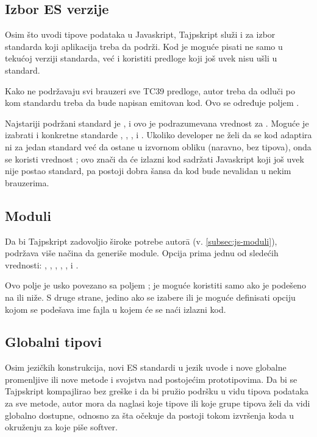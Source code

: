 \subsection{Izbor ES verzije}

Osim što uvodi tipove podataka u Javaskript, Tajpskript služi i za izbor standarda koji aplikacija treba da podrži.
Kod je moguće pisati ne samo u tekućoj verziji standarda, već i koristiti predloge koji još uvek nisu ušli u standard.

Kako ne podržavaju svi brauzeri sve TC39 predloge, autor treba da odluči po kom standardu treba da bude napisan emitovan kod.
Ovo se određuje poljem .

Najstariji podržani standard je , i ovo je podrazumevana vrednost za .
Moguće je izabrati i konkretne standarde , , ,  i .
Ukoliko developer ne želi da se kod adaptira ni za jedan standard već da ostane u izvornom obliku (naravno, bez tipova), onda se koristi vrednost ; ovo znači da će izlazni kod sadržati Javaskript koji još uvek nije postao standard, pa postoji dobra šansa da kod bude nevalidan u nekim brauzerima.

\subsection{Moduli}

Da bi Tajpskript zadovoljio široke potrebe autor\=a (v. \cref{subsec:js-moduli}), podržava više načina da generiše module.
Opcija  prima jednu od sledećih vrednosti: , , , , , i .

Ovo polje je usko povezano sa poljem ;  je moguće koristiti samo ako je  podešeno na  ili niže.
S druge strane, jedino ako se izabere  ili  je moguće definisati opciju  kojom se podešava ime fajla u kojem će se naći izlazni kod.

\subsection{Globalni tipovi}

Osim jezičkih konstrukcija, novi ES standardi u jezik uvode i nove globalne promenljive ili nove metode i svojstva nad postojećim prototipovima.
Da bi se Tajpskript kompajlirao bez greške i da bi pružio podršku u vidu tipova podataka za sve metode, autor mora da naglasi koje tipove ili koje grupe tipova želi da vidi globalno dostupne, odnosno za šta očekuje da postoji tokom izvršenja koda u okruženju za koje piše softver.

